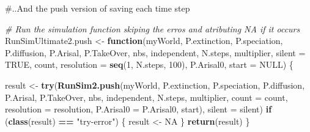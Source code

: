 \documentclass[]{book}
\newenvironment{Shaded}{\begin{snugshade}}{\end{snugshade}}
\newcommand{\KeywordTok}[1]{\textcolor[rgb]{0.13,0.29,0.53}{\textbf{{#1}}}}
\newcommand{\DataTypeTok}[1]{\textcolor[rgb]{0.13,0.29,0.53}{{#1}}}
\newcommand{\DecValTok}[1]{\textcolor[rgb]{0.00,0.00,0.81}{{#1}}}
\newcommand{\StringTok}[1]{\textcolor[rgb]{0.31,0.60,0.02}{{#1}}}
\newcommand{\CommentTok}[1]{\textcolor[rgb]{0.56,0.35,0.01}{\textit{{#1}}}}
\newcommand{\OtherTok}[1]{\textcolor[rgb]{0.56,0.35,0.01}{{#1}}}
\newcommand{\ControlFlowTok}[1]{\textcolor[rgb]{0.13,0.29,0.53}{\textbf{{#1}}}}
\newcommand{\OperatorTok}[1]{\textcolor[rgb]{0.81,0.36,0.00}{\textbf{{#1}}}}
\newcommand{\NormalTok}[1]{{#1}}
\theoremstyle{definition}
\theoremstyle{definition}
\theoremstyle{definition}
\theoremstyle{remark}
\begin{document}
\#..And the push version of saving each time step

\begin{Shaded}
\begin{Highlighting}[]
\CommentTok{# Run the simulation function skiping the erros and atributing NA if it occurs}
\NormalTok{RunSimUltimate2.push <-}\StringTok{ }\ControlFlowTok{function}\NormalTok{(myWorld, P.extinction, P.speciation,}
\NormalTok{                            P.diffusion, P.Arisal, P.TakeOver, nbs, independent,}
\NormalTok{                            N.steps, multiplier,}
                            \DataTypeTok{silent =} \OtherTok{TRUE}\NormalTok{, count, }\DataTypeTok{resolution =} \KeywordTok{seq}\NormalTok{(}\DecValTok{1}\NormalTok{, N.steps, }\DecValTok{100}\NormalTok{),}
\NormalTok{                            P.Arisal0, }\DataTypeTok{start =} \OtherTok{NULL}\NormalTok{) \{}

\NormalTok{  result <-}\StringTok{ }\KeywordTok{try}\NormalTok{(}\KeywordTok{RunSim2.push}\NormalTok{(myWorld, P.extinction, P.speciation,}
\NormalTok{                        P.diffusion, P.Arisal, P.TakeOver, nbs,}
\NormalTok{                        independent, N.steps,}
\NormalTok{                        multiplier, }\DataTypeTok{count =}\NormalTok{ count, }\DataTypeTok{resolution =}\NormalTok{ resolution,}
                        \DataTypeTok{P.Arisal0 =}\NormalTok{ P.Arisal0, start),}
                \DataTypeTok{silent =}\NormalTok{ silent)}
  \ControlFlowTok{if}\NormalTok{ (}\KeywordTok{class}\NormalTok{(result) }\OperatorTok{==}\StringTok{ "try-error"}\NormalTok{) \{}
\NormalTok{    result <-}\StringTok{ }\OtherTok{NA}
\NormalTok{  \}}
  \KeywordTok{return}\NormalTok{(result)}
\NormalTok{\}}
\end{Highlighting}
\end{Shaded}
\end{document}
